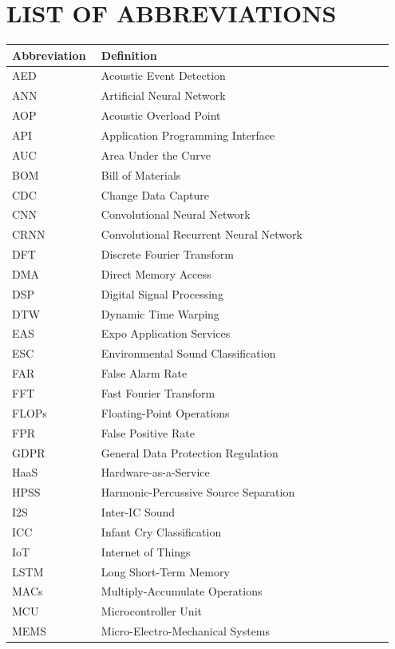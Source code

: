 \documentclass[12pt, a4paper]{report}
\begin{document}
\chapter*{LIST OF ABBREVIATIONS}
\begin{longtable}{@{} p{0.22\linewidth} p{0.73\linewidth} @{}}
\toprule
\textbf{Abbreviation} & \textbf{Definition} \\
\midrule
\endhead
AED & Acoustic Event Detection \\
ANN & Artificial Neural Network \\
AOP & Acoustic Overload Point \\
API & Application Programming Interface \\
AUC & Area Under the Curve \\
BOM & Bill of Materials \\
CDC & Change Data Capture \\
CNN & Convolutional Neural Network \\
CRNN & Convolutional Recurrent Neural Network \\
DFT & Discrete Fourier Transform \\
DMA & Direct Memory Access \\
DSP & Digital Signal Processing \\
DTW & Dynamic Time Warping \\
EAS & Expo Application Services \\
ESC & Environmental Sound Classification \\
FAR & False Alarm Rate \\
FFT & Fast Fourier Transform \\
FLOPs & Floating-Point Operations \\
FPR & False Positive Rate \\
GDPR & General Data Protection Regulation \\
HaaS & Hardware-as-a-Service \\
HPSS & Harmonic-Percussive Source Separation \\
I2S & Inter-IC Sound \\
ICC & Infant Cry Classification \\
IoT & Internet of Things \\
LSTM & Long Short-Term Memory \\
MACs & Multiply-Accumulate Operations \\
MCU & Microcontroller Unit \\
MEMS & Micro-Electro-Mechanical Systems \\

\end{longtable}
\end{document}
